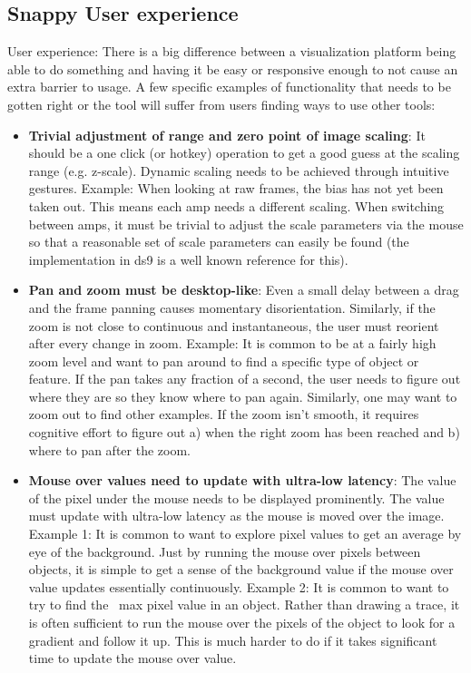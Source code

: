 \subsection{Snappy User experience}
User experience:
There is a big difference between a visualization platform being able to do something and having it be easy or responsive enough to not cause an extra barrier to usage.  A few specific examples of functionality that needs to be gotten right or the tool will suffer from users finding ways to use other tools:
\begin{itemize}

\item \textbf{Trivial adjustment of range and zero point of image scaling}:
It should be a one click (or hotkey) operation to get a good guess at the scaling range (e.g. z-scale).
Dynamic scaling needs to be achieved through intuitive gestures.
Example: When looking at raw frames, the bias has not yet been taken out.  This means each amp needs a different scaling.  When switching between amps, it must be trivial to adjust the scale parameters via the mouse so that a reasonable set of scale parameters can easily be found (the implementation in ds9 is a well known reference for this).
\item \textbf{Pan and zoom must be desktop-like}:
Even a small delay between a drag and the frame panning causes momentary disorientation.
Similarly, if the zoom is not close to continuous and instantaneous, the user must reorient after every change in zoom.
Example: It is common to be at a fairly high zoom level and want to pan around to find a specific type of object or feature.  If the pan takes any fraction of a second, the user needs to figure out where they are so they know where to pan again.  Similarly, one may want to zoom out to find other examples.  If the zoom isn't smooth, it requires cognitive effort to figure out a) when the right zoom has been reached and b) where to pan after the zoom.
\item \textbf{Mouse over values need to update with ultra-low latency}:
The value of the pixel under the mouse needs to be displayed prominently.
The value must update with ultra-low latency as the mouse is moved over the image.
Example 1: It is common to want to explore pixel values to get an average by eye of the background.  Just by running the mouse over pixels between objects, it is simple to get a sense of the background value if the mouse over value updates essentially continuously.
Example 2: It is common to want to try to find the ~max pixel value in an object.  Rather than drawing a trace, it is often sufficient to run the mouse over the pixels of the object to look for a gradient and follow it up.  This is much harder to do if it takes significant time to update the mouse over value.

\end{itemize}
